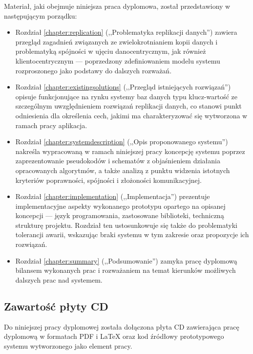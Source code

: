 Materiał, jaki obejmuje niniejsza praca dyplomowa, został przedstawiony w następującym porządku:
\begin{itemize}

\item Rozdział \ref{chapter:replication} (,,Problematyka replikacji danych'') zawiera przegląd zagadnień związanych ze zwielokrotnianiem kopii danych i problematyką spójności w ujęciu danocentrycznym, jak również klientocentrycznym --- poprzedzony zdefiniowaniem modelu systemu rozproszonego jako podstawy do dalszych rozważań.

\item Rozdział \ref{chapter:existingsolutions} (,,Przegląd istniejących rozwiązań'') opisuje funkcjonujące na rynku systemy baz danych typu klucz-wartość ze szczególnym uwzględnieniem rozwiązań replikacji danych, co stanowi punkt odniesienia dla określenia cech, jakimi ma charakteryzować się wytworzona w ramach pracy aplikacja.

\item Rozdział \ref{chapter:systemdescription} (,,Opis proponowanego systemu'') nakreśla wypracowaną w ramach niniejszej pracy koncepcję systemu poprzez zaprezentowanie pseudokodów i schematów z objaśnieniem działania opracowanych algorytmów, a także analizą z punktu widzenia istotnych kryteriów poprawności, spójności i złożoności komunikacyjnej.

\item Rozdział \ref{chapter:implementation} (,,Implementacja'') prezentuje implementacyjne aspekty wykonanego prototypu opartego na opisanej koncepcji --- język programowania, zastosowane biblioteki, techniczną strukturę projektu. Rozdział ten ustosunkowuje się także do problematyki tolerancji awarii, wskazując braki systemu w tym zakresie oraz propozycje ich rozwiązań.

\item Rozdział \ref{chapter:summary} (,,Podsumowanie'') zamyka pracę dyplomową bilansem wykonanych prac i rozważaniem na temat kierunków możliwych dalszych prac nad systemem.

\end{itemize}

\subsection*{Zawartość płyty CD}

Do niniejszej pracy dyplomowej została dołączona płyta CD zawierająca pracę dyplomową w formatach PDF i LaTeX oraz kod źródłowy prototypowego systemu wytworzonego jako element pracy.